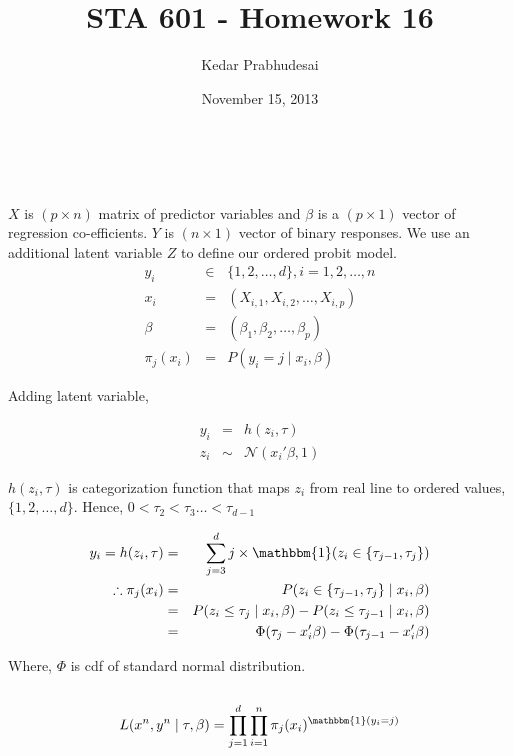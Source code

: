 \documentclass{article}
\title{STA 601 - Homework 16}
\author{Kedar Prabhudesai}
\date{November 15, 2013}
\begin{document}
\maketitle

\\

\\

$X$ is $(p \times n)$ matrix of predictor variables and $\beta$ is a $(p \times 1)$ vector of regression co-efficients. $Y$ is $(n \times 1)$ vector of binary responses. We use an additional latent variable $Z$ to define our ordered probit model.\\

\begin{eqnarray*}
y_i &\in& \{1,2,\ldots,d\},i = 1,2,\ldots,n\\
x_i &=& (X_{i,1},X_{i,2},\ldots,X_{i,p})\\
\beta &=& (\beta_1,\beta_2,\ldots,\beta_p)\\
\pi_j(x_i) &=& P(y_i = j \mid x_i,\beta)
\end{eqnarray*}

Adding latent variable,

\begin{eqnarray*}
y_i &=& h(z_i,\tau)\\
z_i &\sim& \mathcal{N}(x_i'\beta,1)
\end{eqnarray*}

$h(z_i,\tau)$ is categorization function that maps $z_i$ from real line to ordered values, $\{1,2,\ldots,d\}.$ Hence, $0 < \tau_2 < \tau_3 \ldots < \tau_{d-1}$

\begin{eqnarray*}
y_i = h(z_i,\tau) &=& \sum_{j=3}^{d}{j \times \mathbbm{1}(z_i \in \{\tau_{j-1},\tau_j\})}\\
\therefore \pi_j(x_i) &=& P(z_i \in \{\tau_{j-1},\tau_j\} \mid x_i,\beta)\\
&=& P(z_i \le \tau_j \mid x_i,\beta) - P(z_i \le \tau_{j-1} \mid x_i,\beta)\\
&=& \Phi(\tau_j - x_i'\beta) - \Phi(\tau_{j-1} - x_i'\beta)
\end{eqnarray*}

Where, $\Phi$ is cdf of standard normal distribution.\\

\\
\begin{eqnarray*}
L(x^n,y^n \mid \tau,\beta) = \prod_{j=1}^d{\prod_{i=1}^n{\pi_j(x_i)^{\mathbbm{1}(y_i = j)}}}
\end{eqnarray*}
\end{document}

